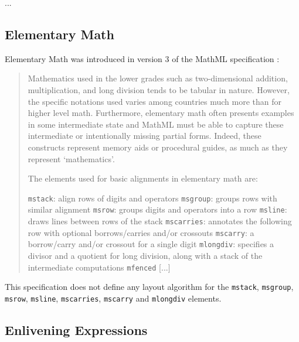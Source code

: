 ...

\subsection{Elementary Math}

Elementary Math was introduced in version 3 of the MathML specification
\cite{MathML3}:

\begin{quote}
Mathematics used in the lower grades such as two-dimensional addition,
multiplication, and long division tends to be tabular in nature. However, the
specific notations used varies among countries much more than for higher level
math. Furthermore, elementary math often presents examples in some intermediate
state and MathML must be able to capture these intermediate or intentionally
missing partial forms. Indeed, these constructs represent memory aids or
procedural guides, as much as they represent ‘mathematics’.

The elements used for basic alignments in elementary math are:

{\tt mstack}: align rows of digits and operators
{\tt msgroup}: groups rows with similar alignment
{\tt msrow}: groups digits and operators into a row
{\tt msline}: draws lines between rows of the stack
{\tt mscarries}: annotates the following row with optional borrows/carries
and/or crossouts
{\tt mscarry}: a borrow/carry and/or crossout for a single digit
{\tt mlongdiv}: specifies a divisor and a quotient for long division, along
with a stack of the intermediate computations
{\tt mfenced}
[...]
\end{quote}

This specification does not define any layout algorithm for the {\tt mstack},
{\tt msgroup}, {\tt msrow}, {\tt msline}, {\tt mscarries}, {\tt mscarry} and
{\tt mlongdiv} elements.

\subsection{Enlivening Expressions}\label{maction}

